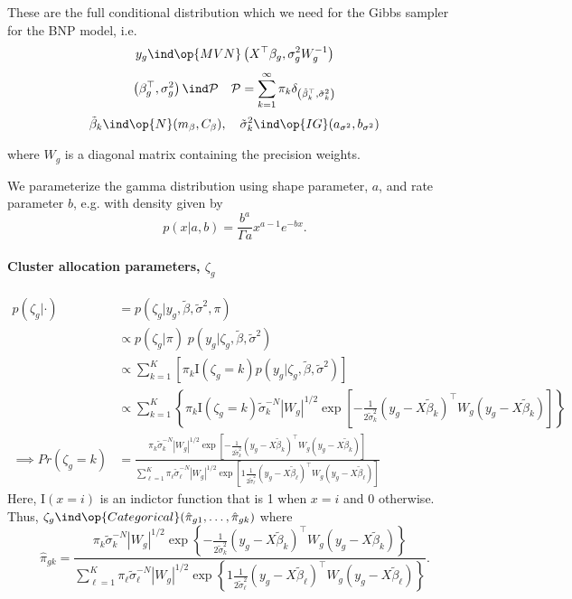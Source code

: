 \label{deriv-full-cond}
\small
These are the full conditional distribution which we need for the Gibbs sampler for the BNP model, i.e.
\[y_{g} \ind \op{MVN} \left( X^\top \beta_g, \sigma^2_g W_g^{-1} \right)\]
\[\left(\beta_g^\top,\sigma^2_g\right) \ind \mathcal{P} \quad
\mathcal{P} =\sum_{k=1}^\infty \pi_k \delta_{\left(\tilde{\beta}_k^\top ,\tilde{\sigma}^2_k\right)}\]
\[\tilde{\beta}_k \ind \op{N}(m_\beta, C_\beta),\quad \tilde{\sigma}^2_k \ind \op{IG}(a_{\sigma^2}, b_{\sigma^2})\]

where $W_g$ is a diagonal matrix containing the precision weights.

We parameterize the gamma distribution using shape parameter, $a$, and rate parameter $b$, e.g. with density given by
\begin{equation*}
p(x|a,b) = \frac{b^a}{\Gamma a}x^{a-1} e^{-bx}.
\end{equation*}

\paragraph{Cluster allocation parameters, $\zeta_g$}
\begin{align*}
p(\zeta_g|\cdot) & = p(\zeta_g|y_g, \tilde{\beta}, \tilde{\sigma}^2, \pi)\\
& \propto  p(\zeta_g|\pi)\; p(y_g|\zeta_g, \tilde{\beta}, \tilde{\sigma}^2)\\
& \propto  \sum_{k=1}^K \left[ \pi_k \mathrm{I}(\zeta_g=k) p(y_g|\zeta_g,\tilde{\beta},\tilde{\sigma}^2)\right]\\
& \propto \sum_{k=1}^K \left\{ \pi_k \mathrm{I}(\zeta_g=k)  \tilde{\sigma}_k^{-N} |W_g|^{1/2} \exp \left[ -\frac{1}{2\tilde{\sigma}^2_k} \left( y_g - X\tilde{\beta}_k \right)^\top W_g \left( y_g - X\tilde{\beta}_k \right) \right]\right\}\\
\implies Pr(\zeta_g=k) & = \frac{\pi_k \tilde{\sigma}_k^{-N} |W_g|^{1/2} \exp \left[ -\frac{1}{2\tilde{\sigma}^2_k} \left( y_g - X\tilde{\beta}_k \right)^\top W_g \left( y_g - X\tilde{\beta}_k \right) \right]}{\sum_{\ell=1}^K \pi_\ell \tilde{\sigma}_\ell^{-N} |W_g|^{1/2} \exp \left[ 1\frac{1}{2\tilde{\sigma}^2_\ell} \left( y_g - X\tilde{\beta}_\ell \right)^\top W_g \left( y_g - X\tilde{\beta}_\ell \right) \right]}
\end{align*}
Here, $\mathrm{I}(x=i)$ is an indictor function that is 1 when $x=i$ and 0 otherwise. 
Thus, $\zeta_g \ind \op{Categorical}(\hat{\pi}_{g1},\ldots,\hat{\pi}_{gk})$ where
\begin{equation*}
\hat{\pi}_{gk} = \frac{\pi_k \tilde{\sigma}_k^{-N} |W_g|^{1/2} \exp \left\{ -\frac{1}{2\tilde{\sigma}^2_k} \left( y_g - X\tilde{\beta}_k \right)^\top W_g \left( y_g - X\tilde{\beta}_k \right) \right\}}{\sum_{\ell=1}^K \pi_\ell \tilde{\sigma}_\ell^{-N} |W_g|^{1/2} \exp \left\{ 1\frac{1}{2\tilde{\sigma}^2_\ell} \left( y_g - X\tilde{\beta}_\ell \right)^\top W_g \left( y_g - X\tilde{\beta}_\ell \right) \right\}}.
\end{equation*}

